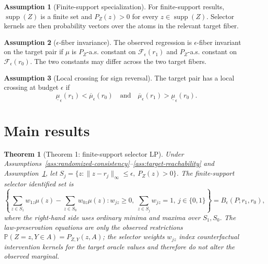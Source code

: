 \documentclass[11pt]{article}
\renewcommand{\Pr}{\mathbb{P}}
\theoremstyle{definition}
\newtheorem{assumption}{Assumption}
\theoremstyle{plain}
\newtheorem{theorem}{Theorem}
\theoremstyle{remark}
\begin{document}
\begin{assumption}[Finite-support specialization]\label{ass:finite-support}
For finite-support results, \(\operatorname{supp}(Z)\) is a finite set and \(P_Z(z)>0\) for every \(z\in\operatorname{supp}(Z)\).  Selector kernels are then probability vectors over the atoms in the relevant target fiber.
\end{assumption}

\begin{assumption}[\(\epsilon\)-fiber invariance]\label{ass:fiber-invariance}
The observed regression is \(\epsilon\)-fiber invariant on the target pair if \(\mu\) is \(P_Z\)-a.s. constant on \(\mathcal F_\epsilon(r_1)\) and \(P_Z\)-a.s. constant on \(\mathcal F_\epsilon(r_0)\).  The two constants may differ across the two target fibers.
\end{assumption}

\begin{assumption}[Local crossing for sign reversal]\label{ass:local-crossing}
The target pair has a local crossing at budget \(\epsilon\) if
\[
\underline\mu_\epsilon(r_1)
<
\overline\mu_\epsilon(r_0)
\quad\text{and}\quad
\overline\mu_\epsilon(r_1)
>
\underline\mu_\epsilon(r_0).
\]
\end{assumption}

\section{Main results}
\begin{theorem}[Theorem 1: finite-support selector LP]\label{thm:finite-support-lp}
Under Assumptions~\ref{ass:randomized-consistency}--\ref{ass:target-reachability} and Assumption~\ref{ass:finite-support}, let \(S_j=\{z:\|z-r_j\|_\infty\le\epsilon,\ P_Z(z)>0\}\).  The finite-support selector identified set is
\[
\left\{
\sum_{z\in S_1}w_{1z}\mu(z)-\sum_{z\in S_0}w_{0z}\mu(z):
w_{jz}\ge0,\ \sum_{z\in S_j}w_{jz}=1,\ j\in\{0,1\}
\right\}
=
B_\epsilon(P;r_1,r_0),
\]
where the right-hand side uses ordinary minima and maxima over \(S_1,S_0\).  The law-preservation equations are only the observed restrictions \(\Pr(Z=z,Y\in A)=P_{Z,Y}(z,A)\); the selector weights \(w_{jz}\) index counterfactual intervention kernels for the target oracle values and therefore do not alter the observed marginal.
\end{theorem}
\end{document}

